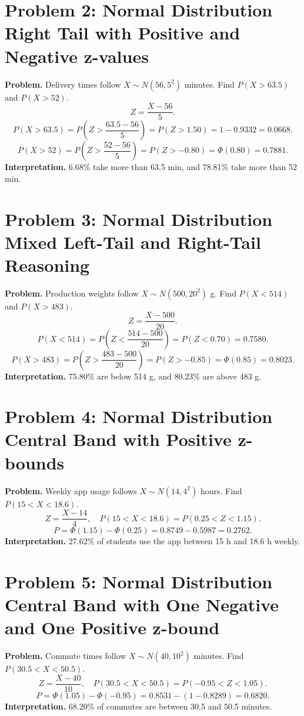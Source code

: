 \section{Problem 2: Normal Distribution Right Tail with Positive and Negative z-values}
\textbf{Problem.} Delivery times follow \(X\sim N(56,5^2)\) minutes. Find \(P(X>63.5)\) and \(P(X>52)\).\\
\[Z=\frac{X-56}{5}.\]
\[P(X>63.5)=P\!\left(Z>\frac{63.5-56}{5}\right)=P(Z>1.50)=1-0.9332=0.0668.\]
\[P(X>52)=P\!\left(Z>\frac{52-56}{5}\right)=P(Z>-0.80)=\Phi(0.80)=0.7881.\]
\textbf{Interpretation.} 6.68\% take more than 63.5 min, and 78.81\% take more than 52 min.

\section{Problem 3: Normal Distribution Mixed Left-Tail and Right-Tail Reasoning}
\textbf{Problem.} Production weights follow \(X\sim N(500,20^2)\) g. Find \(P(X<514)\) and \(P(X>483)\).\\
\[Z=\frac{X-500}{20}.\]
\[P(X<514)=P\!\left(Z<\frac{514-500}{20}\right)=P(Z<0.70)=0.7580.\]
\[P(X>483)=P\!\left(Z>\frac{483-500}{20}\right)=P(Z>-0.85)=\Phi(0.85)=0.8023.\]
\textbf{Interpretation.} 75.80\% are below 514 g, and 80.23\% are above 483 g.

\section{Problem 4: Normal Distribution Central Band with Positive z-bounds}
\textbf{Problem.} Weekly app usage follows \(X\sim N(14,4^2)\) hours. Find \(P(15<X<18.6)\).\\
\[Z=\frac{X-14}{4},\quad P(15<X<18.6)=P(0.25<Z<1.15).\]
\[P=\Phi(1.15)-\Phi(0.25)=0.8749-0.5987=0.2762.\]
\textbf{Interpretation.} 27.62\% of students use the app between 15 h and 18.6 h weekly.

\section{Problem 5: Normal Distribution Central Band with One Negative and One Positive z-bound}
\textbf{Problem.} Commute times follow \(X\sim N(40,10^2)\) minutes. Find \(P(30.5<X<50.5)\).\\
\[Z=\frac{X-40}{10},\quad P(30.5<X<50.5)=P(-0.95<Z<1.05).\]
\[P=\Phi(1.05)-\Phi(-0.95)=0.8531-(1-0.8289)=0.6820.\]
\textbf{Interpretation.} 68.20\% of commutes are between 30.5 and 50.5 minutes.

